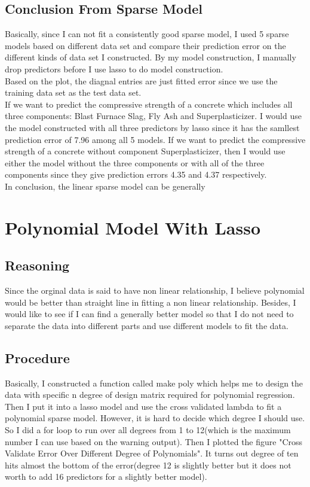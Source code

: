 \documentclass{article}\usepackage[]{graphicx}\usepackage[]{color}
\begin{document}
\subsection*{Conclusion From Sparse Model}
Basically, since I can not fit a consistently good sparse model, I used 5 sparse models based on different data set and compare their prediction error on the different kinds of data set I constructed. By my model construction, I manually drop predictors before I use lasso to do model construction. \\
Based on the plot, the diagnal entries are just fitted error since we use the training data set as the test data set. \\
If we want to predict the compressive strength of a concrete which includes all three components: Blast Furnace Slag, Fly Ash and Superplasticizer. I would use the model constructed with all three predictors by lasso since it has the samllest prediction error of 7.96 among all 5 models. If we want to predict the compressive strength of a concrete without component Superplasticizer, then I would use either the model without the three components or with all of the three components since they give prediction errors 4.35 and 4.37 respectively.\\
In conclusion, the linear sparse model can be generally 


\section*{Polynomial Model With Lasso}
\subsection*{Reasoning}
Since the orginal data is said to have non linear relationship, I believe polynomial would be better than straight line in fitting a non linear relationship. Besides, I would like to see if I can find a generally better model so that I do not need to separate the data into different parts and use different models to fit the data.
\subsection*{Procedure}
Basically, I constructed a function called make poly which helps me to design the data with specific n degree of design matrix required for polynomial regression. Then I put it into a lasso model and use the cross validated lambda to fit a polynomial sparse model. However, it is hard to decide which degree I should use. So I did a for loop to run over all degrees from 1 to 12(which is the maximum number I can use based on the warning output). Then I plotted the figure "Cross Validate Error Over Different Degree of Polynomials". It turns out degree of ten hits almost the bottom of the error(degree 12 is slightly better but it does not worth to add 16 predictors for a slightly better model).\\
\end{document}
